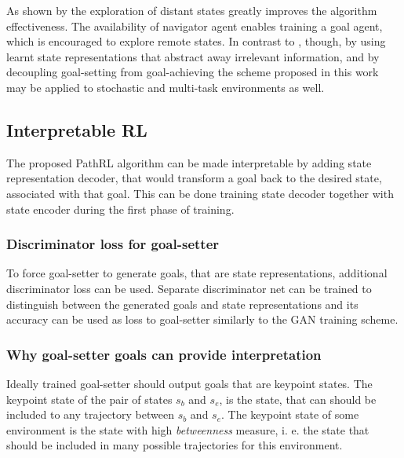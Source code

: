 \documentclass[acmsmall, nonacm]{acmart}
\begin{document}
As shown by \citet{ecoffet_first_2021} the exploration of distant states greatly improves the algorithm effectiveness. The availability of navigator agent enables training a goal agent, which is encouraged to explore remote states.
%
In contrast to \citep{ecoffet_first_2021}, though, by using learnt state representations that abstract away irrelevant information, and by decoupling goal-setting from goal-achieving the scheme proposed in this work may be applied to stochastic and multi-task environments as well.

\subsection{Interpretable RL}

The proposed PathRL algorithm can be made interpretable by adding state representation decoder, that would transform a goal back to the desired state, associated with that goal. This can be done training state decoder together with state encoder during the first phase of training.

\subsubsection{Discriminator loss for goal-setter}

To force goal-setter to generate goals, that are state representations, additional discriminator loss can be used. Separate discriminator net can be trained to distinguish between the generated goals and state representations and its accuracy can be used as loss to goal-setter similarly to the GAN training scheme.

\subsubsection{Why goal-setter goals can provide interpretation}

Ideally trained goal-setter should output goals that are keypoint states. The keypoint state of the pair of states $s_b$ and $s_e$, is the state, that can should be included to any trajectory between $s_b$ and $s_e$. The keypoint state of some environment is the state with high \emph{betweenness} measure, i. e. the state that should be included in many possible trajectories for this environment.
\end{document}
